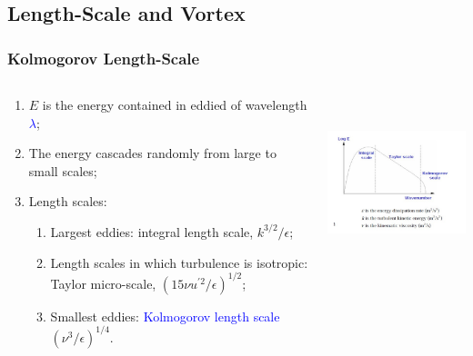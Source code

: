 \documentclass[10pt,compress]{beamer}
\newcommand{\blue}{\textcolor{blue}}
\begin{document}
\subsection{Length-Scale and Vortex}
\begin{frame}
 \frametitle{Kolmogorov Length-Scale}
  \begin{columns}
    \begin{column}[l]{0.5\linewidth}
       \begin{enumerate}%
           \item<1-> $E$ is the energy contained in eddied of wavelength \blue{$\lambda$};
           \item<1-> The energy cascades randomly from large to small scales;
           \item<2-> Length scales:
              \begin{enumerate}%
                  \item<2-> Largest eddies: integral length scale, $k^{3/2}/\epsilon$;
                  \item<2-> Length scales in which turbulence is isotropic: Taylor micro-scale, $\left(15\nu u^{\prime 2}/\epsilon\right)^{1/2}$;
                  \item<2-> Smallest eddies: \blue{Kolmogorov length scale} $\left(\nu^{3}/\epsilon\right)^{1/4}$.
              \end{enumerate}
       \end{enumerate} 
    \end{column}
    \begin{column}[l]{0.5\linewidth}
      \begin{center}
        \includegraphics[width=7.cm, height=5cm, clip]{./Figs/Kolmogorov1}
      \end{center}
    \end{column}

  \end{columns}

\end{frame}
\end{document}
